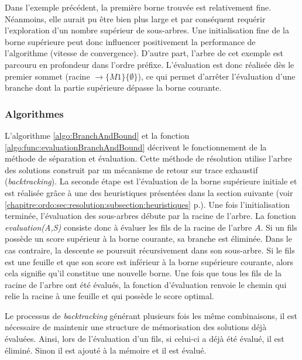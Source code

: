 

Dans l'exemple précédent, la première borne trouvée est relativement fine. Néanmoins, elle aurait pu être bien plus large et par conséquent requérir l'exploration d'un nombre supérieur de sous-arbres. Une initialisation fine de la borne supérieure peut donc influencer positivement la performance de l'algorithme (vitesse de convergence). D'autre part, l'arbre de cet exemple est parcouru en profondeur dans l'ordre préfixe. L'évaluation est donc réalisée dès le premier sommet (racine $\rightarrow \{M1\}\{\emptyset\}$), ce qui permet d'arrêter l'évaluation d'une branche dont la partie supérieure dépasse la borne courante.  

\FloatBarrier

\subsubsection{Algorithmes}

L'algorithme \ref{algo:BranchAndBound} et la fonction \ref{algo:func:evaluationBranchAndBound} décrivent le fonctionnement de la méthode de séparation et évaluation. Cette méthode de résolution utilise l'arbre des solutions construit par un mécanisme de retour sur trace exhaustif (\textit{backtracking}). La seconde étape est l'évaluation de la borne supérieure initiale et est réalisée grâce à une des heuristiques présentées dans la section suivante (voir \ref{chapitre:ordo:sec:resolution:subsection:heuristiques} p.\pageref{chapitre:ordo:sec:resolution:subsection:heuristiques}). Une fois l'initialisation terminée, l'évaluation des sous-arbres débute par la racine de l'arbre. La fonction \textit{evaluation(A,S)} consiste donc à évaluer les fils de la racine de l'arbre $A$. Si un fils possède un score supérieur à la borne courante, sa branche est éliminée. Dans le cas contraire, la descente se poursuit récursivement dans son sous-arbre. Si le fils est une feuille et que son score est inférieur à la borne 
supérieure courante, alors cela signifie qu'il constitue une nouvelle borne. Une fois que tous les fils de la racine de l'arbre ont été évalués, la fonction d'évaluation renvoie le chemin qui relie la racine à une feuille et qui possède le score optimal.

Le processus de \textit{backtracking} générant plusieurs fois les même combinaisons, il est nécessaire de maintenir une structure de mémorisation des solutions déjà évaluées. Ainsi, lors de l'évaluation d'un fils, si celui-ci a déjà été évalué, il est éliminé. Sinon il est ajouté à la mémoire et il est évalué.

